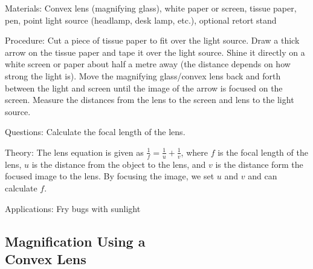\begin{multicols}{2}

\begin{description*}
\item[Materials:]{Convex lens (magnifying glass), white paper or screen, tissue paper, pen, point light source (headlamp, desk lamp, etc.), optional retort stand}
\item[Procedure:]{Cut a piece of tissue paper to fit over the light source. Draw a thick arrow on the tissue paper and tape it over the light source. Shine it directly on a white screen or paper about half a metre away (the distance depends on how strong the light is). Move the magnifying glass/convex lens back and forth between the light and screen until the image of the arrow is focused on the screen. Measure the distances from the lens to the screen and lens to the light source.}
\item[Questions:]{Calculate the focal length of the lens.}
\item[Theory:]{The lens equation is given as $\frac{1}{f} = \frac{1}{u} + \frac{1}{v}$, where $f$ is the focal length of the lens, $u$ is the distance from the object to the lens, and $v$ is the distance form the focused image to the lens. By focusing the image, we set $u$ and $v$ and can calculate $f$. }
\item[Applications:]{Fry bugs with sunlight}
\end{description*}

\subsection[Magnification Using a Convex Lens]{Magnification Using a \hfill \\ Convex Lens} 


\end{multicols}
